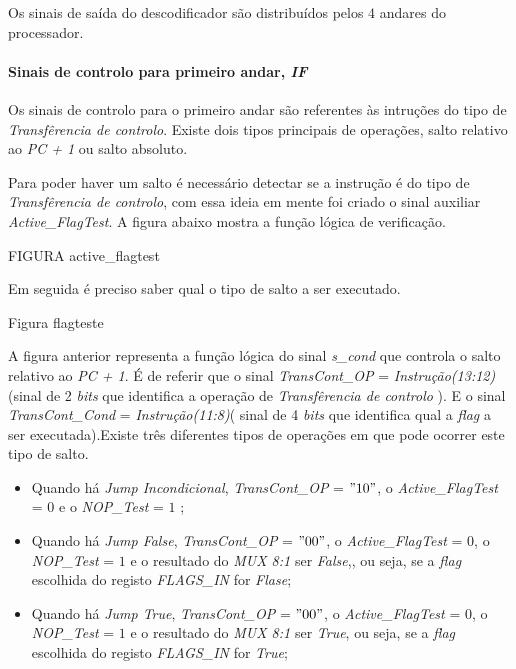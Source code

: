 \documentclass[11pt]{article}
\numberwithin{equation}{section}
\begin{document}
	Os sinais de saída do descodificador são distribuídos pelos $4$ andares do processador.
	
\paragraph{Sinais de controlo para primeiro andar, \textit{IF}}

	
	Os sinais de controlo para o primeiro andar são referentes às intruções do tipo de \textit{Transfêrencia de controlo}. Existe dois tipos principais de operações, salto relativo ao \textit{PC + 1} ou salto absoluto. 
	
	Para poder haver um salto é necessário detectar se a instrução é do tipo de \textit{Transfêrencia de controlo}, com essa ideia em mente foi criado o sinal auxiliar \textit{Active\_FlagTest}. A figura abaixo mostra a função lógica de verificação. 
	
	FIGURA active\_flagtest
	
	Em seguida é preciso saber qual o tipo de salto a ser executado. 
	
	Figura flagteste
	
	A figura anterior representa a função lógica do sinal \textit{s\_cond} que controla o salto relativo ao \textit{PC + 1}. É  de referir que o sinal \textit{TransCont\_OP} = \textit{Instrução(13:12)}(sinal de 2 \textit{bits} que identifica a operação de \textit{Transfêrencia de controlo} ). E o sinal \textit{TransCont\_Cond} = \textit{Instrução(11:8)}( sinal de 4 \textit{bits} que identifica qual a \textit{flag} a ser executada).Existe três diferentes tipos de operações em que pode ocorrer este tipo de salto.
		\begin{itemize}
			\item Quando há \textit{Jump Incondicional}, \textit{TransCont\_OP} = $"10"$, o  \textit{Active\_FlagTest} = $0$ e o  \textit{NOP\_Test} = $1$ ;
			\vspace{-2.5mm}
			\item Quando há \textit{Jump False}, \textit{TransCont\_OP} = $"00"$, o  \textit{Active\_FlagTest} = $0$, o  \textit{NOP\_Test} = $1$ e o resultado do \textit{MUX 8:1} ser \textit{False},, ou seja, se a \textit{flag} escolhida do registo \textit{FLAGS\_IN} for \textit{Flase};
			\vspace{-2.5mm}
			\item Quando há \textit{Jump True}, \textit{TransCont\_OP} = $"00"$, o  \textit{Active\_FlagTest} = $0$, o  \textit{NOP\_Test} = $1$ e o resultado do \textit{MUX 8:1} ser \textit{True}, ou seja, se a \textit{flag} escolhida do registo \textit{FLAGS\_IN} for \textit{True};
		\end{itemize}
	
\end{document}
